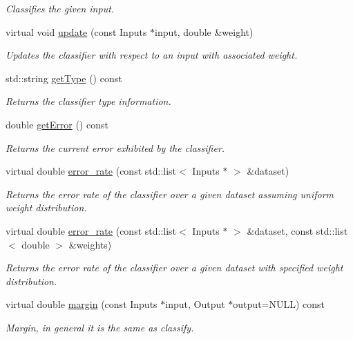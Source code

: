 \begin{DoxyCompactItemize}
\begin{DoxyCompactList}\small\item\em Classifies the given input. \end{DoxyCompactList}\item 
virtual void \hyperlink{classiCub_1_1boostMIL_1_1SelectorClassifier_a8bb80c44b2cb9ef79eb066f2f08e5c4f}{update} (const Inputs $\ast$input, double \&weight)
\begin{DoxyCompactList}\small\item\em Updates the classifier with respect to an input with associated weight. \end{DoxyCompactList}\item 
std\+::string \hyperlink{classiCub_1_1boostMIL_1_1WeakClassifier_aa5de990b0baac11f35f74493ca853ac5}{get\+Type} () const 
\begin{DoxyCompactList}\small\item\em Returns the classifier type information. \end{DoxyCompactList}\item 
double \hyperlink{classiCub_1_1boostMIL_1_1WeakClassifier_a525811a7380bcfd3cbc1edbe90e0842a}{get\+Error} () const 
\begin{DoxyCompactList}\small\item\em Returns the current error exhibited by the classifier. \end{DoxyCompactList}\item 
virtual double \hyperlink{classiCub_1_1boostMIL_1_1WeakClassifier_a8f9de230214c99305df65010e5ddbe77}{error\+\_\+rate} (const std\+::list$<$ Inputs $\ast$ $>$ \&dataset)
\begin{DoxyCompactList}\small\item\em Returns the error rate of the classifier over a given dataset assuming uniform weight distribution. \end{DoxyCompactList}\item 
virtual double \hyperlink{classiCub_1_1boostMIL_1_1WeakClassifier_a294f03d21af03a5f96875562a5a979a0}{error\+\_\+rate} (const std\+::list$<$ Inputs $\ast$ $>$ \&dataset, const std\+::list$<$ double $>$ \&weights)
\begin{DoxyCompactList}\small\item\em Returns the error rate of the classifier over a given dataset with specified weight distribution. \end{DoxyCompactList}\item 
virtual double \hyperlink{classiCub_1_1boostMIL_1_1WeakClassifier_a01b3c3834f0b0b81513ed49907bb2c16}{margin} (const Inputs $\ast$input, Output $\ast$output=N\+U\+L\+L) const 
\begin{DoxyCompactList}\small\item\em Margin, in general it is the same as classify. \end{DoxyCompactList}\end{DoxyCompactItemize}

